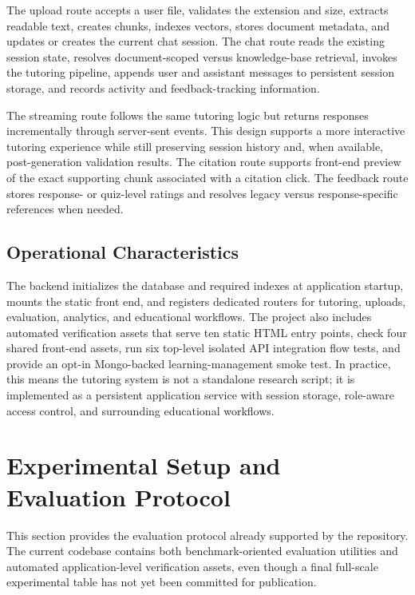 \documentclass[11pt,a4paper]{article}
\begin{document}
The upload route accepts a user file, validates the extension and size, extracts readable text, creates chunks, indexes vectors, stores document metadata, and updates or creates the current chat session. The chat route reads the existing session state, resolves document-scoped versus knowledge-base retrieval, invokes the tutoring pipeline, appends user and assistant messages to persistent session storage, and records activity and feedback-tracking information.

The streaming route follows the same tutoring logic but returns responses incrementally through server-sent events. This design supports a more interactive tutoring experience while still preserving session history and, when available, post-generation validation results. The citation route supports front-end preview of the exact supporting chunk associated with a citation click. The feedback route stores response- or quiz-level ratings and resolves legacy versus response-specific references when needed.

\subsection{Operational Characteristics}

The backend initializes the database and required indexes at application startup, mounts the static front end, and registers dedicated routers for tutoring, uploads, evaluation, analytics, and educational workflows. The project also includes automated verification assets that serve ten static HTML entry points, check four shared front-end assets, run six top-level isolated API integration flow tests, and provide an opt-in Mongo-backed learning-management smoke test. In practice, this means the tutoring system is not a standalone research script; it is implemented as a persistent application service with session storage, role-aware access control, and surrounding educational workflows.

\section{Experimental Setup and Evaluation Protocol}

This section provides the evaluation protocol already supported by the repository. The current codebase contains both benchmark-oriented evaluation utilities and automated application-level verification assets, even though a final full-scale experimental table has not yet been committed for publication.
\end{document}
